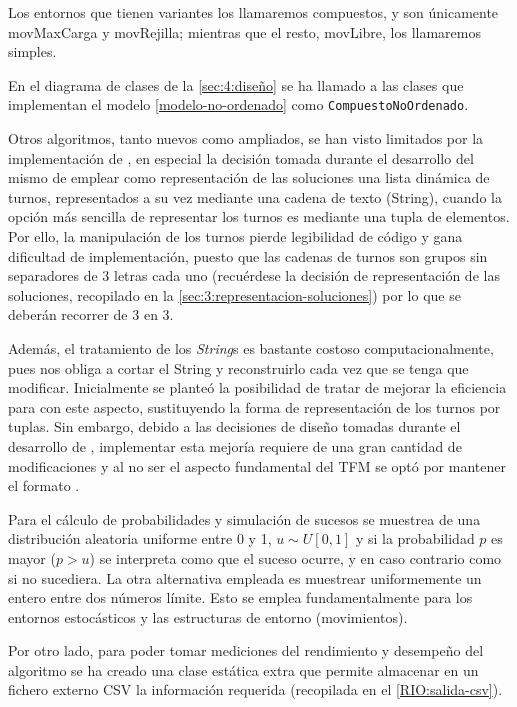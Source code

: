Los entornos que tienen variantes los llamaremos compuestos, y son únicamente movMaxCarga y movRejilla; mientras que el resto, movLibre, los llamaremos simples.

En el diagrama de clases de la \autoref{sec:4:diseño} se ha llamado a las clases que implementan el modelo \ref{modelo-no-ordenado} como \texttt{CompuestoNoOrdenado}.

Otros algoritmos, tanto nuevos como ampliados, se han visto limitados por la implementación de \legacy{}, en especial la decisión tomada durante el desarrollo del mismo de emplear como representación de las soluciones una lista dinámica de turnos, representados a su vez mediante una cadena de texto (String), cuando la opción más sencilla de representar los turnos es mediante una tupla de elementos. Por ello, la manipulación de los turnos pierde legibilidad de código y gana dificultad de implementación, puesto que las cadenas de turnos son grupos sin separadores de 3 letras cada uno (recuérdese la decisión de representación de las soluciones, recopilado en la \autoref{sec:3:representacion-soluciones}) por lo que se deberán recorrer de 3 en 3.

Además, el tratamiento de los \textit{String}s es bastante costoso computacionalmente, pues nos obliga a cortar el String y reconstruirlo cada vez que se tenga que modificar. Inicialmente se planteó la posibilidad de tratar de mejorar la eficiencia para con este aspecto, sustituyendo la forma de representación de los turnos por tuplas. Sin embargo, debido a las decisiones de diseño tomadas durante el desarrollo de \legacy{}, implementar esta mejoría requiere de una gran cantidad de modificaciones y al no ser el aspecto fundamental del TFM se optó por mantener el formato \legacy{}.

Para el cálculo de probabilidades y simulación de sucesos se muestrea de una distribución aleatoria uniforme entre 0 y 1, $u \sim U[0,1]$ y si la probabilidad $p$ es mayor ($p>u$) se interpreta como que el suceso ocurre, y en caso contrario como si no sucediera. 
La otra alternativa empleada es muestrear uniformemente un entero entre dos números límite. 
Esto se emplea fundamentalmente para los entornos estocásticos y las estructuras de entorno (movimientos).

Por otro lado, para poder tomar mediciones del rendimiento y desempeño del algoritmo se ha creado una clase estática extra que permite almacenar en un fichero externo CSV la información requerida (recopilada en el \ref{RIO:salida-csv}).

